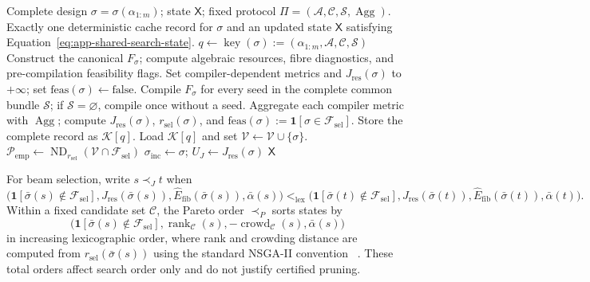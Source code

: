 \documentclass[a4paper,onecolumn,11pt,unpublished]{quantumarticle}
\theoremstyle{remark}
\begin{document}
\begin{algorithm}[H]
\caption{Candidate evaluation and global-state update}
\label{alg:app-evaluate}
\begin{algorithmic}[1]
\Require Complete design $\sigma=\sigma(\alpha_{1:m})$; state $\mathsf X$;
fixed protocol $\Pi=(\mathcal A,\mathcal C,\mathcal S,\operatorname{Agg})$.
\Ensure Exactly one deterministic cache record for $\sigma$ and an updated state
$\mathsf X$ satisfying Equation~\eqref{eq:app-shared-search-state}.
\State $q\gets\operatorname{key}(\sigma)
:=(\alpha_{1:m},\mathcal A,\mathcal C,\mathcal S)$
    \State Construct the canonical $F_\sigma$; compute algebraic resources,
    fibre diagnostics, and pre-compilation feasibility flags.
        \State Set compiler-dependent metrics and $J_{\mathrm{res}}(\sigma)$ to $+\infty$;
        set $\mathrm{feas}(\sigma)\gets\mathrm{false}$.
    \Else
        \State Compile $F_\sigma$ for every seed in the complete common bundle
        $\mathcal S$; if $\mathcal S=\varnothing$, compile once without a seed.
        \State Aggregate each compiler metric with $\operatorname{Agg}$; compute
        $J_{\mathrm{res}}(\sigma)$, $r_{\mathrm{sel}}(\sigma)$, and
        $\mathrm{feas}(\sigma):=\mathbf1[\sigma\in\mathcal F_{\mathrm{sel}}]$.
    \EndIf
    \State Store the complete record as $\mathcal K[q]$.
\EndIf
\State Load $\mathcal K[q]$ and set $\mathcal V\gets\mathcal V\cup\{\sigma\}$.
\State $\mathcal P_{\mathrm{emp}}\gets
\operatorname{ND}_{r_{\mathrm{sel}}}
(\mathcal V\cap\mathcal F_{\mathrm{sel}})$
    \State $\sigma_{\mathrm{inc}}\gets\sigma$;
    $U_J\gets J_{\mathrm{res}}(\sigma)$
\EndIf
\State \Return $\mathsf X$
\end{algorithmic}
\end{algorithm}

For beam selection, write $s\prec_J t$ when
\begin{equation}
\bigl(
\mathbf1[\bar\sigma(s)\notin\mathcal F_{\mathrm{sel}}],
J_{\mathrm{res}}(\bar\sigma(s)),
\widehat E_{\mathrm{fib}}(\bar\sigma(s)),
\bar\alpha(s)
\bigr)
<_{\mathrm{lex}}
\bigl(
\mathbf1[\bar\sigma(t)\notin\mathcal F_{\mathrm{sel}}],
J_{\mathrm{res}}(\bar\sigma(t)),
\widehat E_{\mathrm{fib}}(\bar\sigma(t)),
\bar\alpha(t)
\bigr).
\label{eq:app-beam-score-order}
\end{equation}
Within a fixed candidate set $\mathcal C$, the Pareto order $\prec_P$ sorts states by
\begin{equation}
\bigl(
\mathbf1[\bar\sigma(s)\notin\mathcal F_{\mathrm{sel}}],
\operatorname{rank}_{\mathcal C}(s),
-\operatorname{crowd}_{\mathcal C}(s),
\bar\alpha(s)
\bigr)
\label{eq:app-beam-pareto-order}
\end{equation}
in increasing lexicographic order, where rank and crowding distance are computed from
$r_{\mathrm{sel}}(\bar\sigma(s))$ using the standard NSGA-II convention
~\cite{DebEtAl2002}.  These total orders affect search order only and do not
justify certified pruning.
\end{document}
